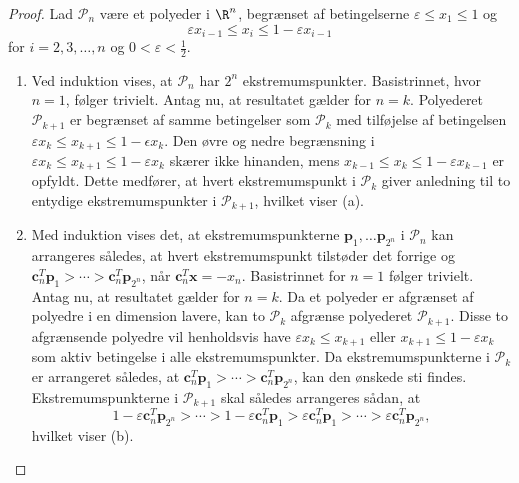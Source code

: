 \begin{proof}
%
Lad $\mathcal{P}_n$ være et polyeder i $\R^n$, begrænset af betingelserne $\varepsilon \leq x_1 \leq 1$ og $$\varepsilon x_{i-1} \leq x_i \leq 1 - \varepsilon x_{i-1}$$ for $i = 2, 3, \ldots, n$ og $0 < \varepsilon < \frac{1}{2}$.
%
\begin{enumerate}[label = (\alph*)]
\item Ved induktion vises, at $\mathcal{P}_n$ har $2^n$ ekstremumspunkter. 
Basistrinnet, hvor $n=1$, følger trivielt.
Antag nu, at resultatet gælder for $n=k$.
Polyederet $\mathcal{P}_{k+1}$ er begrænset af samme betingelser som $\mathcal{P}_{k}$ med tilføjelse af betingelsen $\varepsilon x_{k} \leq x_{k+1} \leq 1 - \epsilon x_{k}$.
Den øvre og nedre begrænsning i $\varepsilon x_{k} \leq x_{k+1} \leq 1 - \varepsilon x_{k}$ skærer ikke hinanden, mens $ x_{k-1} \leq x_k \leq 1 - \varepsilon x_{k-1}$ er opfyldt.
Dette medfører, at hvert ekstremumspunkt i $\mathcal{P}_{k}$ giver anledning til to entydige ekstremumspunkter i $\mathcal{P}_{k+1}$, hvilket viser (a).
%
%
\item Med induktion vises det, at ekstremumspunkterne $\textbf{p}_1, \ldots \textbf{p}_{2^n}$ i $\mathcal{P}_n$ kan arrangeres således, at hvert ekstremumspunkt tilstøder det forrige og $\textbf{c}_n^T  \textbf{p}_1 > \cdots > \textbf{c}_n^T  \textbf{p}_{2^n}$, når $\textbf{c}_n^T \textbf{x} = -x_n$.
Basistrinnet for $n=1$ følger trivielt.
Antag nu, at resultatet gælder for  $n = k$.
Da et polyeder er afgrænset af polyedre i en dimension lavere, kan to $\mathcal{P}_k$ afgrænse polyederet $\mathcal{P}_{k+1}$.
Disse to afgrænsende polyedre vil henholdsvis have $\varepsilon x_{k} \leq x_{k+1}$ eller $x_{k+1} \leq 1 - \varepsilon x_{k}$ som aktiv betingelse i alle ekstremumspunkter.
Da ekstremumspunkterne i $\mathcal{P}_k$ er arrangeret således, at $\textbf{c}_n^T  \textbf{p}_1 > \cdots > \textbf{c}_n^T  \textbf{p}_{2^n}$, kan den ønskede sti findes.
Ekstremumspunkterne i $\mathcal{P}_{k+1}$ skal således arrangeres sådan, at $$1 - \varepsilon \textbf{c}_n^T \textbf{p}_{2^n} > \cdots > 1 - \varepsilon \textbf{c}_n^T  \textbf{p}_1 > \varepsilon \textbf{c}_n^T  \textbf{p}_1 > \cdots > \varepsilon \textbf{c}_n^T \textbf{p}_{2^n},$$
hvilket viser (b).


\end{enumerate}
\end{proof}
